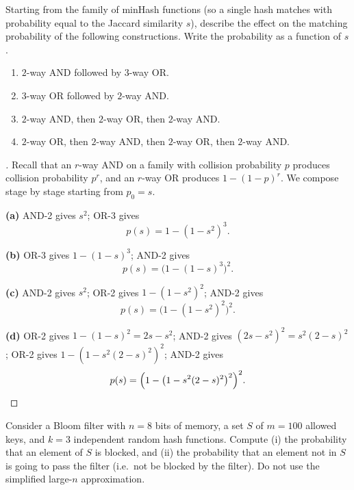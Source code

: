 \documentclass[en,hazy,blue,12pt,normal]{../../elegantnote}
\begin{document}
\begin{homework}
Starting from the family of minHash functions (so a single hash matches with probability equal to the Jaccard similarity $s$), describe the effect on the matching probability of the following constructions. Write the probability as a function of $s$.
\begin{enumerate}
    \item[(a)] $2$-way AND followed by $3$-way OR.
    \item[(b)] $3$-way OR followed by $2$-way AND.
    \item[(c)] $2$-way AND, then $2$-way OR, then $2$-way AND.
    \item[(d)] $2$-way OR, then $2$-way AND, then $2$-way OR, then $2$-way AND.
\end{enumerate}
\end{homework}

\begin{proof}[\solutionname]
Recall that an $r$-way AND on a family with collision probability $p$ produces collision probability $p^r$, and an $r$-way OR produces $1-(1-p)^r$. We compose stage by stage starting from $p_0=s$.

\textbf{(a)} AND-2 gives $s^2$; OR-3 gives
\[
p(s)=1-(1-s^2)^3.
\]

\textbf{(b)} OR-3 gives $1-(1-s)^3$; AND-2 gives
\[
p(s)=\bigl(1-(1-s)^3\bigr)^2.
\]

\textbf{(c)} AND-2 gives $s^2$; OR-2 gives $1-(1-s^2)^2$; AND-2 gives
\[
p(s)=\bigl(1-(1-s^2)^2\bigr)^2.
\]

\textbf{(d)} OR-2 gives $1-(1-s)^2 = 2s-s^2$; AND-2 gives $(2s-s^2)^2 = s^2(2-s)^2$; OR-2 gives $1-(1-s^2(2-s)^2)^2$; AND-2 gives
\[
p(s)=\Bigl(1-\bigl(1-s^2(2-s)^2\bigr)^2\Bigr)^2.
\]
\end{proof}

\begin{homework}
Consider a Bloom filter with $n=8$ bits of memory, a set $S$ of $m=100$ allowed keys, and $k=3$ independent random hash functions. Compute (i) the probability that an element of $S$ is blocked, and (ii) the probability that an element not in $S$ is going to pass the filter (i.e.\ not be blocked by the filter). Do not use the simplified large-$n$ approximation.
\end{homework}
\end{document}

